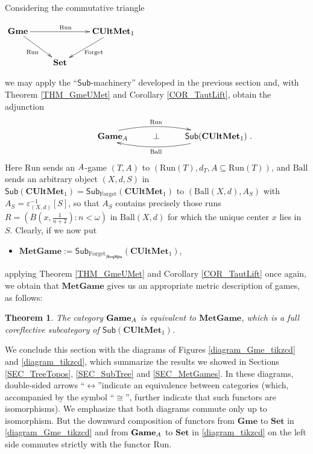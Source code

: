 \documentclass[12pt]{amsart}
\newtheorem{thm}{Theorem}[section]
\theoremstyle{definition}
\newcommand{\seq}[1]{{\left( {#1} \right)}}
\newcommand{\A}{\textup{\textmd{\textsc{A}}}}
\newcommand{\Run}{{\mathrm{Run}}}
\newcommand{\Sets}{\mathbf{Set}}
\newcommand{\CUMet}{\mathbf{CUltMet}_1}
\newcommand{\MetGame}{\mathbf{MetGame}}
\newcommand{\Games}{\mathbf{Game}}
\newcommand{\Gmes}{\mathbf{Gme}}
\newcommand{\Sub}[1]{\mathsf{Sub}\left({#1}\right)}
\begin{document}
Considering the commutative triangle
\begin{center}
	$\xymatrix{\Gmes\ar[rr]^{\mathrm{Run}}\ar[rd]_{\mathrm{Run}} && \CUMet\ar[ld]^{\mathrm{Forget}} \\
		& \Sets  \\
	}$
\end{center}
we may apply the ``$\mathsf{Sub}$-machinery''
developed in the previous section and, with Theorem \ref{THM_GmeUMet} and Corollary \ref{COR_TautLift},
obtain the adjunction
$$\xymatrix{\qquad\qquad\Games_{\A}\ar@/^1.0pc/[rr]^{\mathrm{Run}} &\bot& \mathsf{Sub}(\CUMet)\ar@/^1.0pc/[ll]^{\mathrm{Ball}}}.$$ 
Here $\mathrm{Run}$ sends an $\A$-game $(T,A)$ to $(\mathrm{Run}(T),d_T,A\subseteq\mathrm{Run}(T))$, and $\mathrm{Ball}$ sends an arbitrary object $(X,d,S)$ in $\mathsf{Sub}(\CUMet)=\mathsf{Sub}_{\mathrm{Forget}}(\CUMet) $ to $(\mathrm{Ball}(X,d),A_S)$ with $A_S=\varepsilon_{(X,d)}^{-1}[S]$, so that $A_S$ contains precisely those runs $R=\seq{\overline{B}\left(x,\frac{1}{n+2}\right):n<\omega} $ in $\mathrm{Ball}(X,d)$ for which the unique center $x$ lies in $S$.
Clearly, if we now put 
\begin{itemize}
	\item $\mathbf{MetGame}:=\mathsf{Sub}_{\mathrm{Forget}_{|\mathbf{SeqSpa}}}(\CUMet)$,
\end{itemize}
applying Theorem \ref{THM_GmeUMet} and Corollary \ref{COR_TautLift} once again, we obtain that $\mathbf{MetGame}$ gives us an appropriate metric description of games, as follows:

\begin{thm}\label{THM_UMetEqv}
	The category $\Games_\A$ is equivalent to $\MetGame$, which is a full coreflective subcategory of $\Sub{\CUMet}$.
\end{thm}


We conclude this section with the diagrams of Figures \ref{diagram_Gme_tikzcd} and \ref{diagram_tikzcd}, which summarize the results we showed in Sections \ref{SEC_TreeTopos}, \ref{SEC_SubTree} and \ref{SEC_MetGames}. 
In these diagrams, double-sided arrows ``$\leftrightarrow$''indicate an equivalence between categories (which, accompanied by the symbol ``$\cong$'', further indicate that such functors are isomorphisms). We emphasize that both diagrams commute only up to isomorphism. But  the downward composition of functors from $\Gmes$ to $\Sets$ in \ref{diagram_Gme_tikzcd} and from $\Games_\A$ to $\Sets$ in \ref{diagram_tikzcd} on the left side commutes strictly with the functor $\Run$.
\end{document}
